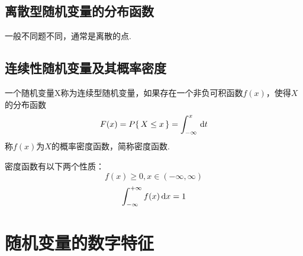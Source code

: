 \subsection{离散型随机变量的分布函数}
一般不同题不同，通常是离散的点.\jg

\subsection{连续性随机变量及其概率密度}
\tdefination[概率密度]
一个随机变量X称为连续型随机变量，如果存在一个非负可积函数$f(x)$，使得$X$的分布函数
\begin{equation}
F(x)=P\lbrace\, X\le x \,\rbrace=\int_{-\infty}^{x}\, {\rm{d}} t
\end{equation}
称$f(x)$为$X$的概率密度函数，简称密度函数.\jg

\dya[密度函数的性质]
密度函数有以下两个性质：
\begin{equation}
f(x)\ge 0,x\in (-\infty,\infty)
\end{equation}
\begin{equation}
\int_{-\infty}^{+\infty }f(x)\,{\rm{d}} x=1
\end{equation}

\section{随机变量的数字特征}
